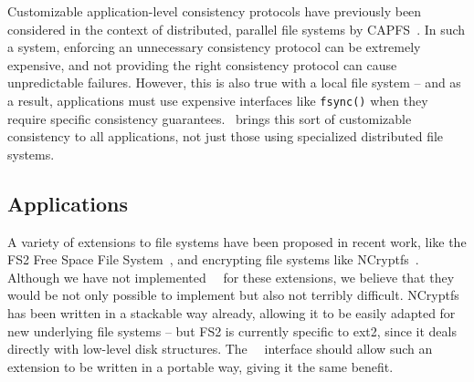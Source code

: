 Customizable application-level consistency protocols have previously been
considered in the context of distributed, parallel file systems by
CAPFS~\cite{vilayannur05providing}. In such a system, enforcing an unnecessary
consistency protocol can be extremely expensive, and not providing the right
consistency protocol can cause unpredictable failures. However, this is also
true with a local file system -- and as a result, applications must use
expensive interfaces like \texttt{fsync()} when they require specific
consistency guarantees. \Kudos\ brings this sort of customizable consistency to
all applications, not just those using specialized distributed file systems.


\subsection{Applications}

A variety of extensions to file systems have been proposed in recent work, like
the FS2 Free Space File System~\cite{...}, and encrypting file systems like
NCryptfs~\cite{wright01ncryptfs}. Although we have not implemented \Kudos\
\modules\ for these extensions, we believe that they would be not only possible
to implement but also not terribly difficult. NCryptfs has been written in a
stackable way already, allowing it to be easily adapted for new underlying file
systems -- but FS2 is currently specific to ext2, since it deals directly with
low-level disk structures. The \Kudos\ \module\ interface should allow such an
extension to be written in a portable way, giving it the same benefit.
